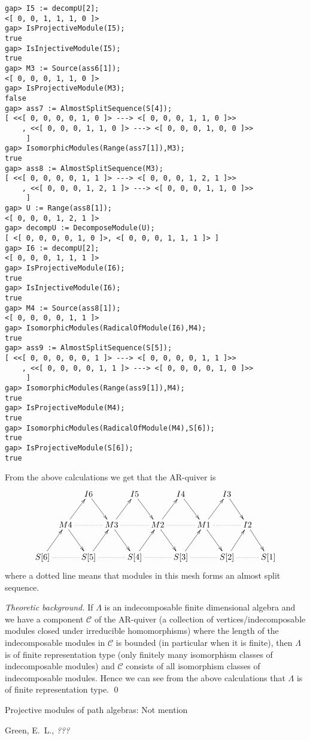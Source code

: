 \documentclass{amsart}
\theoremstyle{definition}
\theoremstyle{theoretic}
\newenvironment{theoback}
{\medskip\footnotesize\textit{Theoretic background.} }
{\qed\par\medskip}
\begin{document}
\begin{verbatim}
gap> I5 := decompU[2];
<[ 0, 0, 1, 1, 1, 0 ]>
gap> IsProjectiveModule(I5);               
true
gap> IsInjectiveModule(I5);                
true
gap> M3 := Source(ass6[1]);
<[ 0, 0, 0, 1, 1, 0 ]>
gap> IsProjectiveModule(M3);
false
gap> ass7 := AlmostSplitSequence(S[4]);    
[ <<[ 0, 0, 0, 0, 1, 0 ]> ---> <[ 0, 0, 0, 1, 1, 0 ]>>
    , <<[ 0, 0, 0, 1, 1, 0 ]> ---> <[ 0, 0, 0, 1, 0, 0 ]>>
     ]
gap> IsomorphicModules(Range(ass7[1]),M3);
true
gap> ass8 := AlmostSplitSequence(M3);     
[ <<[ 0, 0, 0, 0, 1, 1 ]> ---> <[ 0, 0, 0, 1, 2, 1 ]>>
    , <<[ 0, 0, 0, 1, 2, 1 ]> ---> <[ 0, 0, 0, 1, 1, 0 ]>>
     ]
gap> U := Range(ass8[1]);                 
<[ 0, 0, 0, 1, 2, 1 ]>
gap> decompU := DecomposeModule(U);       
[ <[ 0, 0, 0, 0, 1, 0 ]>, <[ 0, 0, 0, 1, 1, 1 ]> ]
gap> I6 := decompU[2];
<[ 0, 0, 0, 1, 1, 1 ]>
gap> IsProjectiveModule(I6);
true
gap> IsInjectiveModule(I6);
true
gap> M4 := Source(ass8[1]);
<[ 0, 0, 0, 0, 1, 1 ]>
gap> IsomorphicModules(RadicalOfModule(I6),M4);
true
gap> ass9 := AlmostSplitSequence(S[5]);
[ <<[ 0, 0, 0, 0, 0, 1 ]> ---> <[ 0, 0, 0, 0, 1, 1 ]>>
    , <<[ 0, 0, 0, 0, 1, 1 ]> ---> <[ 0, 0, 0, 0, 1, 0 ]>>
     ]
gap> IsomorphicModules(Range(ass9[1]),M4);
true
gap> IsProjectiveModule(M4);
true
gap> IsomorphicModules(RadicalOfModule(M4),S[6]);
true
gap> IsProjectiveModule(S[6]);
true
\end{verbatim}
From the above calculations we get that the AR-quiver is 
\[\xymatrix@C=5pt{
& & I6\ar[dr] &&  I5\ar[dr] &&  I4\ar[dr] &&  I3\ar[dr] &&  \\
& M4\ar[ur]\ar[dr]\ar@{..}[rr] && M3\ar[ur]\ar[dr]\ar@{..}[rr] &&
M2\ar[ur]\ar[dr]\ar@{..}[rr] && M1\ar[ur]\ar[dr]\ar@{..}[rr] && I2\ar[dr] & \\ 
S[6] \ar[ur]\ar@{..}[rr] && S[5] \ar[ur]\ar@{..}[rr] && S[4]
\ar[ur]\ar@{..}[rr] && S[3] \ar[ur]\ar@{..}[rr] && S[2]
\ar[ur]\ar@{..}[rr] && S[1] 
}\]
where a dotted line means that modules in this mesh forms an almost
split sequence. 

\begin{theoback}
  If $\Lambda$ is an indecomposable finite dimensional algebra and we
  have a component $\mathcal{C}$ of the AR-quiver (a collection of
  vertices/indecomposable modules closed under irreducible
  homomorphisms) where the length of the indecomposable modules in
  $\mathcal{C}$ is bounded (in particular when it is finite), then
  $\Lambda$ is of finite representation type (only finitely many
  isomorphism classes of indecomposable modules) and $\mathcal{C}$
  consists of all isomorphism classes of indecomposable modules.
  Hence we can see from the above calculations that $\Lambda$ is of
  finite representation type. 
\end{theoback}


Projective modules of path algebras:
Not mention


\begin{thebibliography}{99}
 Green, E.\ L., \emph{???}
\end{thebibliography}
\end{document}
